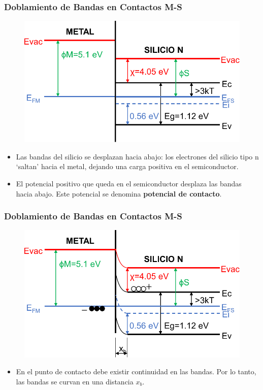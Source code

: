 \documentclass[10pt,t,aspectratio=169]{beamer}
\begin{document}
\begin{frame}[t]
    \frametitle{Doblamiento de Bandas en Contactos M-S}

    \begin{figure}[t]
        \includegraphics[scale=0.6]{./figures/contacto-MS-3.pdf}
    \end{figure}

    \begin{itemize}
        \item Las bandas del silicio se desplazan hacia abajo: los electrones del silicio tipo n ‘saltan’ hacia el metal, dejando una carga positiva en el semiconductor.
        \item El potencial positivo que queda en el semiconductor desplaza las bandas hacia abajo. Este potencial se denomina \textbf{potencial de contacto}.
    \end{itemize}
\end{frame}


\begin{frame}[t]
    \frametitle{Doblamiento de Bandas en Contactos M-S}

    \begin{figure}[t]
        \includegraphics[scale=0.6]{./figures/contacto-MS-4.pdf}
    \end{figure}

    \begin{itemize}
        \item En el punto de contacto debe existir continuidad en las bandas. Por lo tanto, las bandas se curvan en una distancia $x_b$.
    \end{itemize}
\end{frame}
\end{document}
